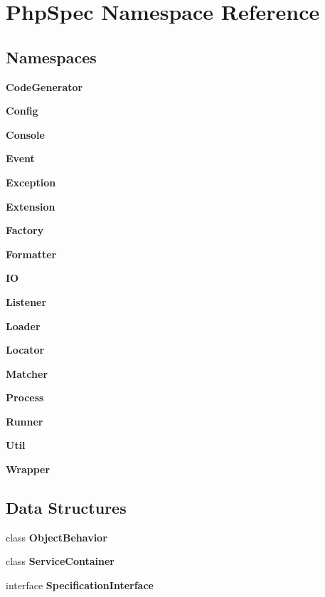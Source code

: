 \section{Php\+Spec Namespace Reference}
\label{namespace_php_spec}
\subsection*{Namespaces}
\begin{DoxyCompactItemize}
\item 
 {\bf Code\+Generator}
\item 
 {\bf Config}
\item 
 {\bf Console}
\item 
 {\bf Event}
\item 
 {\bf Exception}
\item 
 {\bf Extension}
\item 
 {\bf Factory}
\item 
 {\bf Formatter}
\item 
 {\bf I\+O}
\item 
 {\bf Listener}
\item 
 {\bf Loader}
\item 
 {\bf Locator}
\item 
 {\bf Matcher}
\item 
 {\bf Process}
\item 
 {\bf Runner}
\item 
 {\bf Util}
\item 
 {\bf Wrapper}
\end{DoxyCompactItemize}
\subsection*{Data Structures}
\begin{DoxyCompactItemize}
\item 
class {\bf Object\+Behavior}
\item 
class {\bf Service\+Container}
\item 
interface {\bf Specification\+Interface}
\end{DoxyCompactItemize}
